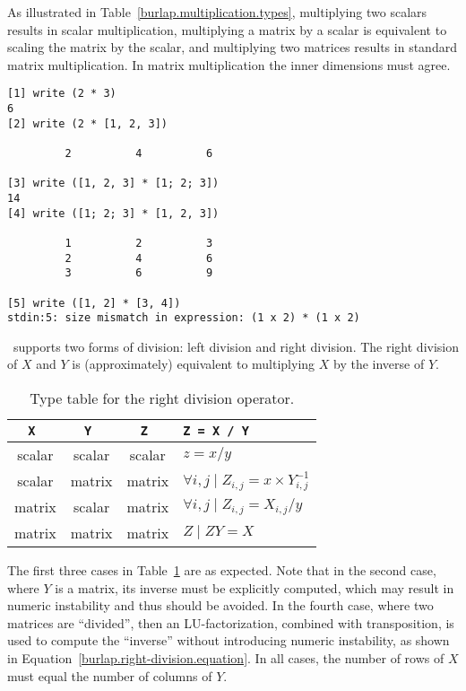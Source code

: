 As illustrated in Table~\ref{burlap.multiplication.types}, multiplying
two scalars results in scalar multiplication, multiplying a matrix by
a scalar is equivalent to scaling the matrix by the scalar, and
multiplying two matrices results in standard matrix multiplication.
In matrix multiplication the inner dimensions must agree.

\begin{screen}
\begin{verbatim}
[1] write (2 * 3)
6
[2] write (2 * [1, 2, 3])

         2          4          6 

[3] write ([1, 2, 3] * [1; 2; 3])
14
[4] write ([1; 2; 3] * [1, 2, 3])

         1          2          3 
         2          4          6 
         3          6          9 

[5] write ([1, 2] * [3, 4])
stdin:5: size mismatch in expression: (1 x 2) * (1 x 2)
\end{verbatim}
\end{screen}

\burlap\ supports two forms of division: left division and right
division.  The right division of $X$ and $Y$ is (approximately)
equivalent to multiplying $X$ by the inverse of $Y$.

\begin{table}[htbp]
\begin{center}
\begin{tabular}{c|c|c|l}
\tt X  & \tt Y	& \tt Z	 & \tt Z = X / Y				      \\
\hline
scalar & scalar & scalar & $z = x / y$					      \\
scalar & matrix & matrix & $\forall i,j \mid Z_{i,j} = x \times Y^{-1}_{i,j}$ \\
matrix & scalar & matrix & $\forall i,j \mid Z_{i,j} = X_{i,j} / y$	      \\
matrix & matrix & matrix & $Z \mid Z Y = X$				      \\
\end{tabular}
\caption{Type table for the right division operator.}
\label{burlap.right-division.types}
\end{center}
\end{table}

The first three cases in Table~\ref{burlap.right-division.types} are
as expected.  Note that in the second case, where $Y$ is a matrix, its
inverse must be explicitly computed, which may result in numeric
instability and thus should be avoided.  In the fourth case, where two
matrices are ``divided'', then an LU-factorization, combined with
transposition, is used to compute the ``inverse'' without introducing
numeric instability, as shown in
Equation~\ref{burlap.right-division.equation}.  In all cases, the
number of rows of $X$ must equal the number of columns of $Y$.

